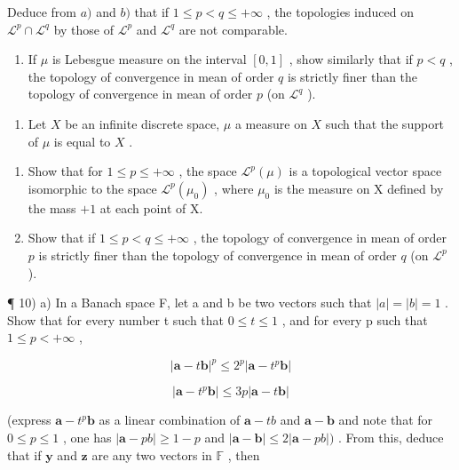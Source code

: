 Deduce from \(a)\) and \(b)\) that if \(1 \leqslant p < q \leqslant +\infty\) , the topologies induced on \(\mathcal{L}^p \cap \mathcal{L}^q\) by those of \(\mathcal{L}^p\) and \(\mathcal{L}^q\) are not comparable.

\begin{enumerate}
\def\labelenumi{\alph{enumi})}
\setcounter{enumi}{2}
\tightlist
\item
  If \(\mu\) is Lebesgue measure on the interval \([0,1]\) , show similarly that if \(p < q\) , the topology of convergence in mean of order \(q\) is strictly finer than the topology of convergence in mean of order \(p\) (on \(\mathcal{L}^q\) ).
\end{enumerate}

\begin{enumerate}
\def\labelenumi{\arabic{enumi})}
\setcounter{enumi}{8}
\tightlist
\item
  Let \(X\) be an infinite discrete space, \(\mu\) a measure on \(X\) such that the support of \(\mu\) is equal to \(X\) .
\end{enumerate}

\begin{enumerate}
\def\labelenumi{\alph{enumi})}
\item
  Show that for \(1 \leqslant p \leqslant +\infty\) , the space \(\mathcal{L}^p(\mu)\) is a topological vector space isomorphic to the space \(\mathcal{L}^p(\mu_0)\) , where \(\mu_0\) is the measure on X defined by the mass \(+1\) at each point of X.
\item
  Show that if \(1 \leqslant p < q \leqslant +\infty\) , the topology of convergence in mean of order \(p\) is strictly finer than the topology of convergence in mean of order \(q\) (on \(\mathcal{L}^p\) ).
\end{enumerate}

¶ 10) a) In a Banach space F, let a and b be two vectors such that \(|a| = |b| = 1\) . Show that for every number t such that \(0 \leqslant t \leqslant 1\) , and for every p such that \(1 \leqslant p < +\infty\) ,

\[
| \mathbf {a} - t \mathbf {b} | ^ {p} \leqslant 2 ^ {p} | \mathbf {a} - t ^ {p} \mathbf {b} |\tag{1}
\]

\[
| \mathbf {a} - t ^ {p} \mathbf {b} | \leqslant 3 p | \mathbf {a} - t \mathbf {b} |\tag{2}
\]

(express \(\mathbf{a} - t^{p}\mathbf{b}\) as a linear combination of \(\mathbf{a} - tb\) and \(\mathbf{a} - \mathbf{b}\) and note that for \(0\leqslant p\leqslant 1\) , one has \(|\mathbf{a} - pb|\geqslant 1 - p\) and \(|\mathbf{a} - \mathbf{b}|\leqslant 2|\mathbf{a} - pb|)\) . From this, deduce that if \(\mathbf{y}\) and \(\mathbf{z}\) are any two vectors in \(\mathbb{F}\) , then

